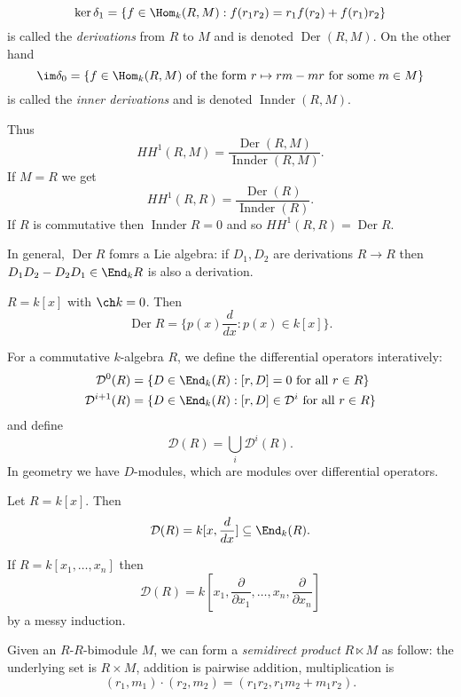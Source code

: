 \documentclass[a4paper]{article}
\DeclareMathOperator{\Der}{Der}
\DeclareMathOperator{\Innder}{Innder}
\begin{document}
\begin{definition}
  \[
    \ker \delta_1 = \{f \in \Hom_k(R, M): f(r_1r_2) = r_1f(r_2) + f(r_1)r_2\}
  \]
  is called the \emph{derivations} from \(R\) to \(M\) and is denoted \(\Der(R, M)\). On the other hand
  \[
    \im \delta_0 = \{f \in \Hom_k(R, M) \text{ of the form } r \mapsto rm - mr \text{ for some } m \in M\}
  \]
  is called the \emph{inner derivations} and is denoted \(\Innder(R, M)\).
\end{definition}

Thus
\[
  HH^1(R, M) = \frac{\Der(R, M)}{\Innder(R, M)}.
\]
If \(M = R\) we get
\[
  HH^1(R, R) = \frac{\Der(R)}{\Innder(R)}.
\]
If \(R\) is commutative then \(\Innder R = 0\) and so \(HH^1(R, R) = \Der R\).

In general, \(\Der R\) fomrs a Lie algebra: if \(D_1, D_2\) are derivations \(R \to R\) then \(D_1D_2 - D_2D_1 \in \End_k R\) is also a derivation.

\begin{eg}
  \(R = k[x]\) with \(\ch k = 0\). Then
  \[
    \Der R = \{p(x) \frac{d}{dx}: p(x) \in k[x]\}.
  \]
\end{eg}

For a commutative \(k\)-algebra \(R\), we define the differential operators interatively:
\begin{align*}
  \mathcal D^0(R) &= \{D \in \End_k(R): [r, D] = 0 \text{ for all } r \in R\} \\
  \mathcal D^{i + 1} (R) &= \{D \in \End_k(R): [r, D] \in \mathcal D^i \text{ for all } r \in R\} \\
\end{align*}
and define
\[
  \mathcal D(R) = \bigcup_i \mathcal D^i(R).
\]
In geometry we have \(D\)-modules, which are modules over differential operators.

\begin{eg}
  Let \(R = k[x]\). Then
  \[
    \mathcal D(R) = k[x, \frac{d}{dx}] \subseteq \End_k(R).
  \]

  If \(R = k[x_1, \dots, x_n]\) then
  \[
    \mathcal D(R) = k[x_1, \frac{\partial  }{\partial x_1}, \dots, x_n, \frac{\partial  }{\partial x_n}]
  \]
  by a messy induction.
\end{eg}

\begin{definition}
  Given an \(R\)-\(R\)-bimodule \(M\), we can form a \emph{semidirect product} \(R \ltimes M\) as follow: the underlying set is \(R \times M\), addition is pairwise addition, multiplication is
  \[
    (r_1, m_1) \cdot (r_2, m_2) = (r_1r_2, r_1m_2 + m_1r_2).
  \]
\end{definition}
\end{document}
